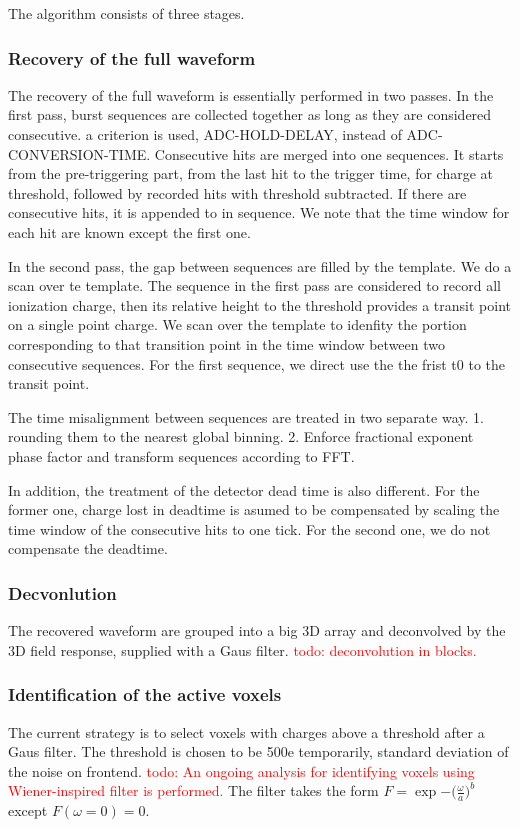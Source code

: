 \documentclass[a4paper,11pt]{article}
\begin{document}
The algorithm consists of three stages.

\subsubsection{Recovery of the full waveform}
The recovery of the full waveform is essentially performed in two passes. In the first pass, burst sequences are collected together as long as they are considered consecutive. a criterion is used, ADC-HOLD-DELAY, instead of ADC-CONVERSION-TIME.
Consecutive hits are merged into one sequences. It starts from the pre-triggering part, from the last hit to the trigger time, for charge at threshold, followed by recorded hits with threshold subtracted. If there are consecutive hits, it is appended to in sequence. We note that the time window for each hit are known except the first one.

In the second pass, the gap between sequences are filled by the template. We do a scan over te template. The sequence in the first pass are considered to record all ionization charge, then its relative height to the threshold provides a transit point on a single point charge. We scan over the template to idenfity the portion corresponding to that transition point in the time window between two consecutive sequences. For the first sequence, we direct use the the frist t0 to the transit point.

The time misalignment between sequences are treated in two separate way. 1. rounding them to the nearest global binning. 2. Enforce fractional exponent phase factor and transform sequences according to FFT.

In addition, the treatment of the detector dead time is also different. For the former one, charge lost in deadtime is asumed to be compensated by scaling the time window of the consecutive hits to one tick. For the second one, we do not compensate the deadtime.

\subsubsection{Decvonlution}
The recovered waveform are grouped into a big 3D array and deconvolved by the 3D field response, supplied with a Gaus filter.
\textcolor{red}{todo: deconvolution in blocks.}
\subsubsection{Identification of the active voxels}
The current strategy is to select voxels with charges above a threshold after a Gaus filter. The threshold is chosen to be 500e temporarily, standard deviation of the noise on frontend.
\textcolor{red}{todo: An ongoing analysis for identifying voxels using Wiener-inspired filter is performed.} The filter takes the form $F={\exp{-(\frac{\omega}{a}})^b}$ except $F(\omega=0)=0$.
\end{document}
